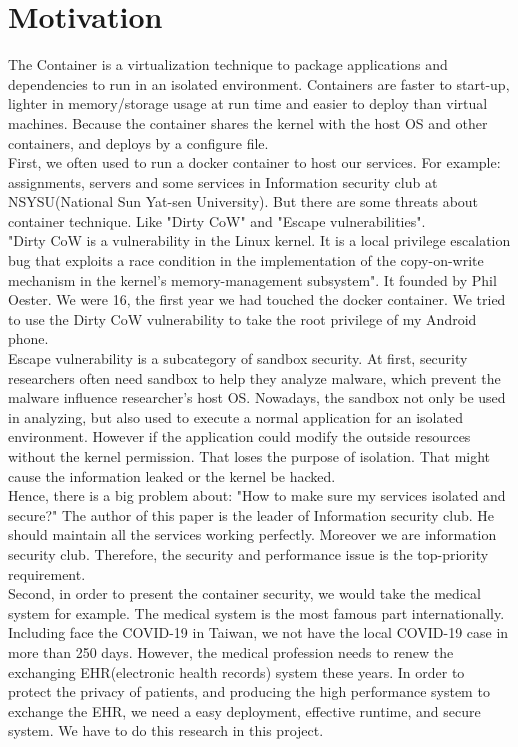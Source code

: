\documentclass[12pt,a4paper,oneside]{IEEEconf}
\begin{document}
\section{Motivation}
The Container is a virtualization technique to package applications and dependencies to run in
an isolated environment. Containers are faster to start-up, lighter in memory/storage usage
at run time and easier to deploy than virtual machines. Because the container shares the
kernel with the host OS and other containers, and deploys by a configure file.\\
First, we often used to run a docker container to host our services. For example: assignments,
servers and some services in Information security club at NSYSU(National Sun Yat-sen University).
But there are some threats about container technique. Like "Dirty CoW\cite{Dirty_CoW}"
and "Escape vulnerabilities".\\
"Dirty CoW is a vulnerability in the Linux kernel. It is a local privilege escalation bug
that exploits a race condition in the implementation of the copy-on-write mechanism in the
kernel's memory-management subsystem"\cite{Dirty_CoW_wiki}. It founded by Phil Oester. We
were 16, the first year we had touched the docker container. We tried to use the Dirty CoW
vulnerability to take the root privilege of my Android phone.\\
Escape vulnerability is a subcategory of sandbox security. At first, security researchers often
need sandbox to help they analyze malware, which prevent the malware influence researcher's
host OS. Nowadays, the sandbox not only be used in analyzing, but also used to execute a
normal application for an isolated environment. However if the application could modify the
outside resources without the kernel permission. That loses the purpose of isolation. That
might cause the information leaked or the kernel be hacked.\\
Hence, there is a big problem about: "How to make sure my services isolated and secure?" The
author of this paper is the leader of Information security club. He should maintain all
the services working perfectly. Moreover we are information security club. Therefore,
the security and performance issue is the top-priority requirement.\\
Second, in order to present the container security, we would take the medical system for
example.
The medical system is the most famous part internationally. Including face the COVID-19
in Taiwan, we not have the local COVID-19 case in more than 250 days.\cite{COVID19_CNN}
However, the medical profession needs to renew the exchanging EHR(electronic health records)
system these years. In order to protect the privacy of patients, and producing the high
performance system to exchange the EHR, we need a easy deployment, effective runtime, and
secure system. We have to do this research in this project.
\end{document}
